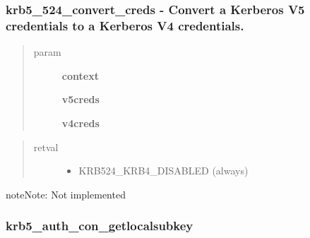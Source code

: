 \documentclass[letterpaper,10pt,english]{sphinxmanual}
\begin{document}
\subsubsection{krb5\_524\_convert\_creds -  Convert a Kerberos V5 credentials to a Kerberos V4 credentials.}
\label{appdev/refs/api/krb5_524_convert_creds:krb5-524-convert-creds-convert-a-kerberos-v5-credentials-to-a-kerberos-v4-credentials}\label{appdev/refs/api/krb5_524_convert_creds::doc}

\begin{fulllineitems}
\label{appdev/refs/api/krb5_524_convert_creds:krb5_524_convert_creds}
\end{fulllineitems}

\begin{quote}\begin{description}
\item[{param}] \leavevmode
\textbf{context}

\textbf{v5creds}

\textbf{v4creds}

\end{description}\end{quote}
\begin{quote}\begin{description}
\item[{retval}] \leavevmode\begin{itemize}
\item {} 
KRB524\_KRB4\_DISABLED   (always)

\end{itemize}

\end{description}\end{quote}

\begin{notice}{note}{Note:}
Not implemented
\end{notice}


\subsubsection{krb5\_auth\_con\_getlocalsubkey}
\label{appdev/refs/api/krb5_auth_con_getlocalsubkey::doc}\label{appdev/refs/api/krb5_auth_con_getlocalsubkey:krb5-auth-con-getlocalsubkey}
\end{document}
